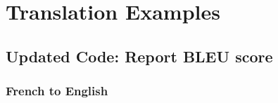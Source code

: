 \documentclass[11pt]{article}
\begin{document}
    \hypertarget{translation-examples}{%
\section{Translation Examples}\label{translation-examples}}

    \hypertarget{updated-code-report-bleu-score}{%
\subsection{Updated Code: Report BLEU
score}\label{updated-code-report-bleu-score}}

    \hypertarget{french-to-english}{%
\subsubsection{French to English}\label{french-to-english}}
\end{document}
